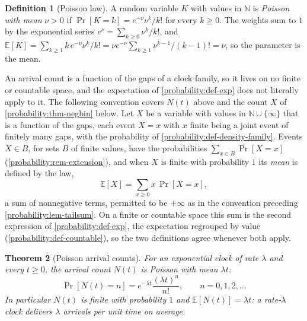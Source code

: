 \documentclass[11pt,a4paper]{article}
\newtheorem{theorem}{Theorem}[section]
\theoremstyle{definition}
\newtheorem{definition}[theorem]{Definition}
\theoremstyle{remark}
\newcommand{\N}{\ensuremath{\mathbb{N}}}
\newcommand{\E}{\ensuremath{\mathbb{E}}}
\begin{document}
\begin{definition}[Poisson law]\label{probability:def-poisson}
A random variable \(K\) with values in \(\N\) is \emph{Poisson with
mean} \(\nu > 0\) if \(\Pr[K = k] = e^{-\nu}\nu^k/k!\) for every
\(k \ge 0\). The weights sum to \(1\) by the exponential series
\(e^{\nu} = \sum_{k \ge 0} \nu^k/k!\), and
\(\E[K] = \sum_{k \ge 1} k\, e^{-\nu}\nu^k/k!
= \nu e^{-\nu} \sum_{k \ge 1} \nu^{k-1}/(k-1)! = \nu\), so the
parameter is the mean.
\end{definition}

An arrival count is a function of the gaps of a clock family, so it
lives on no finite or countable space, and the expectation of
\cref{probability:def-exp} does not literally apply to it. The
following convention covers \(N(t)\) above and the count \(X\) of
\cref{probability:thm-negbin} below. Let
\(X\) be a variable with values in \(\N \cup \{\infty\}\) that is a
function of the gaps, each event \(X = x\) with \(x\) finite being a
joint event of finitely many gaps, with the probability of
\cref{probability:def-density-family}. Events \(X \in B\), for sets
\(B\) of finite values, have the probabilities
\(\sum_{x \in B} \Pr[X = x]\) (\cref{probability:rem-extension}), and
when \(X\) is finite with probability \(1\) its \emph{mean} is
defined by the law,
\[
\E[X] = \sum_{x \ge 0} x\,\Pr[X = x] ,
\]
a sum of nonnegative terms, permitted to be \(+\infty\) as in the
convention preceding \cref{probability:lem-tailsum}. On a finite or
countable space this sum is the second expression of
\cref{probability:def-exp}, the expectation regrouped by value
(\cref{probability:def-countable}), so the two definitions agree
whenever both apply.

\begin{theorem}[Poisson arrival counts]
\label{probability:thm-poisson-count}
For an exponential clock of rate \(\lambda\) and every \(t \ge 0\),
the arrival count \(N(t)\) is Poisson with mean \(\lambda t\):
\[
\Pr[N(t) = n] = e^{-\lambda t}\frac{(\lambda t)^n}{n!},
\qquad n = 0, 1, 2, \ldots
\]
In particular \(N(t)\) is finite with probability \(1\) and
\(\E[N(t)] = \lambda t\): a rate-\(\lambda\) clock delivers
\(\lambda\) arrivals per unit time on average.
\end{theorem}
\end{document}
